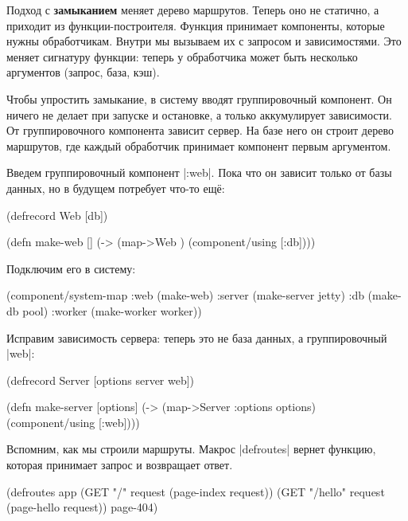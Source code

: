 Подход с \textbf{замыканием} меняет дерево маршрутов. Теперь оно не статично, а
приходит из функции-построителя. Функция принимает компоненты, которые нужны
обработчикам. Внутри мы вызываем их с запросом и зависимостями. Это меняет
сигнатуру функции: теперь у обработчика может быть несколько аргументов (запрос,
база, кэш).

Чтобы упростить замыкание, в систему вводят группировочный компонент. Он ничего
не делает при запуске и остановке, а только аккумулирует зависимости. От
группировочного компонента зависит сервер. На базе него он строит дерево
маршрутов, где каждый обработчик принимает компонент первым аргументом.

Введем группировочный компонент \spverb|:web|. Пока что он зависит только от
базы данных, но в будущем потребует что-то ещ\"{е}:

\begin{english}
  \begin{clojure}
(defrecord Web [db])

(defn make-web []
  (-> (map->Web {})
      (component/using [:db])))
  \end{clojure}
\end{english}

\noindent
Подключим его в систему:

\begin{english}
  \begin{clojure}
(component/system-map
 :web    (make-web)
 :server (make-server jetty)
 :db     (make-db pool)
 :worker (make-worker worker))
  \end{clojure}
\end{english}

Исправим зависимость сервера: теперь это не база данных, а группировочный
\spverb|web|:

\begin{english}
  \begin{clojure}
(defrecord Server
  [options server web])

(defn make-server
  [options]
  (-> (map->Server {:options options})
      (component/using [:web])))
  \end{clojure}
\end{english}

Вспомним, как мы строили маршруты. Макрос \spverb|defroutes| вернет функцию,
которая принимает запрос и возвращает ответ.

\begin{english}
  \begin{clojure}
(defroutes app
  (GET "/"      request (page-index request))
  (GET "/hello" request (page-hello request))
  page-404)
  \end{clojure}
\end{english}

